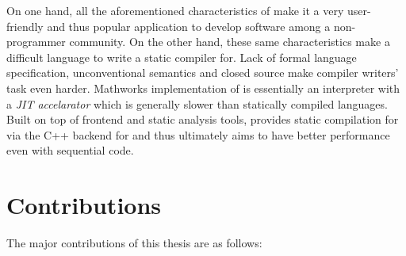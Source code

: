 On one hand, all the aforementioned characteristics of \matlab make it a very 
user-friendly and thus popular application to develop software among a
non-programmer community. On the other hand, these same characteristics make
\matlab a difficult language to write a static compiler for. Lack of formal 
language specification, unconventional semantics and closed source make compiler
writers' task even harder. Mathworks implementation of \matlab is essentially an
interpreter with a \emph{JIT accelarator} which is generally slower than statically
compiled languages. Built on top of \mclab frontend and static analysis tools,
 \mixten provides static compilation for \matlab via the C++
backend for \xten and thus ultimately aims to have better performance even with
sequential code. 

\section{Contributions}
  
The major contributions  of this thesis are as follows:

